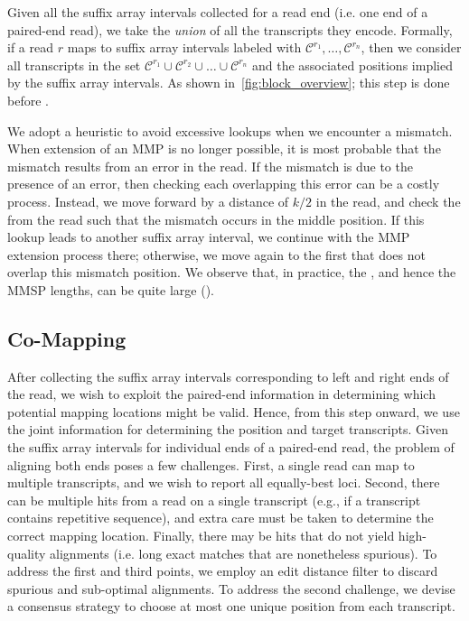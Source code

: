 Given all the suffix array intervals collected for a read end (i.e. one end of a 
paired-end read), we take the \emph{union} of all the transcripts they encode. 
Formally, if  a read $r$ maps to suffix array intervals labeled with $\mathcal{C}^{r_1}, 
\ldots, \mathcal{C}^{r_n}$, then we consider all transcripts in the set $\mathcal{C}^{r_1} 
\cup \mathcal{C}^{r_2} \cup \ldots \cup \mathcal{C}^{r_n}$ and the associated positions 
implied by the suffix array intervals. As shown in~\cref{fig:block_overview}; 
this step is done before \cm.

We adopt a heuristic to avoid excessive \kmer lookups when we encounter a mismatch. 
When extension of an MMP is no longer possible, it is most probable that the mismatch 
results from an error in the read. If the mismatch is due to the presence of an error, 
then checking each \kmer overlapping this error can be a costly process. Instead, 
we move forward by a distance of $k/2$ in the read, and check the \kmer from the read 
such that the mismatch occurs in the middle position. If this \kmer lookup leads to 
another suffix array interval, we continue with the MMP extension process there; 
otherwise, we move again to the first \kmer that does not overlap this mismatch 
position. We observe that, in practice, the \kslcp, and hence the MMSP lengths, can 
be quite large ().

\subsection{Co-Mapping}
After collecting the suffix array intervals corresponding to left and right ends of the read, we wish to exploit 
the paired-end information in determining which potential mapping locations might be valid.  Hence, from this step 
onward, we use the joint information for determining the position and target transcripts. Given the suffix array 
intervals for individual ends of a paired-end read, the problem of aligning both ends poses a few challenges. 
First, a single read can map to multiple transcripts, and we wish to report all equally-best loci. Second, there 
can be multiple hits from a read on a single transcript (e.g., if a transcript contains repetitive sequence), and 
extra care must be taken to determine the correct mapping location. Finally, there may be hits that do not yield 
high-quality alignments (i.e. long exact matches that are nonetheless spurious).  To address the first and third 
points, we employ an edit distance filter to discard spurious and sub-optimal alignments.  To address the second 
challenge, we devise a consensus strategy to choose at most one unique position from each transcript.

